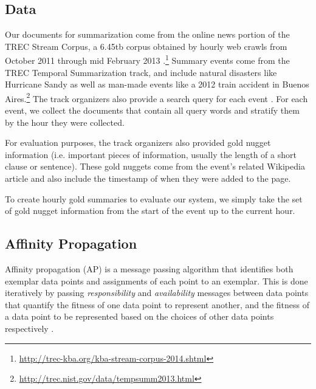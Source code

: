 \documentclass{sig-alternate} \usepackage{url} \usepackage{color}
\begin{document}
\subsection{Data}

Our documents for summarization come from the online news portion of the TREC
Stream Corpus, a 6.45tb corpus obtained by hourly web crawls from October 2011
through mid February 2013
\cite{frank2012building}.\footnote{\url{http://trec-kba.org/kba-stream-corpus-2014.shtml}}
Summary events come from the TREC Temporal Summarization track, and include
natural disasters like Hurricane Sandy as well as man-made events like a 2012
train accident in Buenos
Aires.\footnote{\url{http://trec.nist.gov/data/tempsumm2013.html}} The track
organizers also provide a search query for each event \cite{aslam2013trec}.
For each event, we collect the documents that contain all query words and
stratify them by the hour they were collected. 

For evaluation purposes, the track organizers also provided gold nugget
information (i.e. important pieces of information, usually the length of a
short clause or sentence). These gold nuggets come from the event's related
Wikipedia article and also include the timestamp of when they were added to
the page.

To create hourly gold summaries to evaluate our system, we simply take the set
of gold nugget information from the start of the event up to the current hour. 

\subsection{Affinity Propagation}

Affinity propagation (AP) is a message passing algorithm that identifies both
exemplar data points and assignments of each point to an exemplar.  This is
done iteratively by passing \emph{responsibility} and \emph{availability}
messages between data points that quantify the fitness of one data point to
represent another, and the fitness of a data point to be represented based on
the choices of other data points respectively \cite{dueck2007non}.


\end{document}
